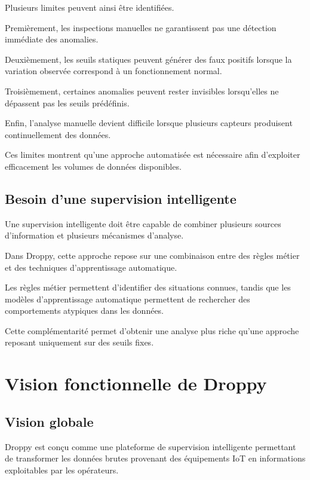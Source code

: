Plusieurs limites peuvent ainsi être identifiées.

Premièrement, les inspections manuelles ne garantissent pas une détection
immédiate des anomalies.

Deuxièmement, les seuils statiques peuvent générer des faux positifs lorsque
la variation observée correspond à un fonctionnement normal.

Troisièmement, certaines anomalies peuvent rester invisibles lorsqu'elles
ne dépassent pas les seuils prédéfinis.

Enfin, l'analyse manuelle devient difficile lorsque plusieurs capteurs
produisent continuellement des données.

Ces limites montrent qu'une approche automatisée est nécessaire afin
d'exploiter efficacement les volumes de données disponibles.

\subsection{Besoin d'une supervision intelligente}

Une supervision intelligente doit être capable de combiner plusieurs
sources d'information et plusieurs mécanismes d'analyse.

Dans Droppy, cette approche repose sur une combinaison entre des règles
métier et des techniques d'apprentissage automatique.

Les règles métier permettent d'identifier des situations connues, tandis
que les modèles d'apprentissage automatique permettent de rechercher des
comportements atypiques dans les données.

Cette complémentarité permet d'obtenir une analyse plus riche qu'une
approche reposant uniquement sur des seuils fixes.


\section{Vision fonctionnelle de Droppy}

\subsection{Vision globale}

Droppy est conçu comme une plateforme de supervision intelligente permettant
de transformer les données brutes provenant des équipements IoT en
informations exploitables par les opérateurs.

